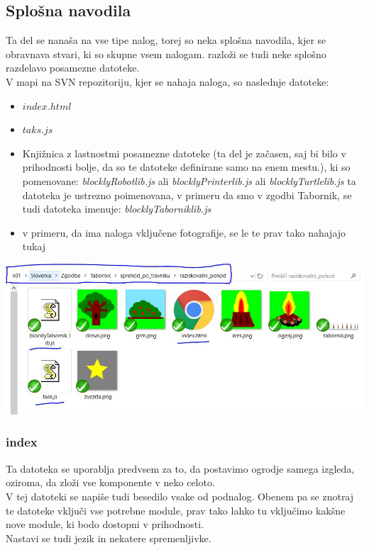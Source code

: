 \documentclass[11pt]{article} %
\begin{document}
\subsection{Splošna navodila}

Ta del se nanaša na vse tipe nalog, torej so neka splošna navodila, kjer se obravnava stvari, ki so skupne vsem nalogam. razloži se tudi neke splošno razdelavo posamezne datoteke.\\

V mapi na SVN repozitoriju, kjer se nahaja naloga, so naslednje datoteke:
\begin{itemize}
\item \textit{$index.html$}
\item \textit{$taks.js$}
\item Knjižnica z lastnostmi posamezne datoteke (ta del je začasen, saj bi bilo v prihodnosti bolje, da so te datoteke definirane samo na enem mestu.), ki so pomenovane: \textit{blocklyRobot\textunderscore lib.js} ali \textit{blocklyPrinter\textunderscore lib.js} ali \textit{blocklyTurtle\textunderscore lib.js} ta datoteka je ustrezno poimenovana, v primeru da smo v zgodbi Tabornik, se tudi datoteka imenuje: \textit{blocklyTabornik\textunderscore lib.js}
\item v primeru, da ima naloga vključene fotografije, se le te prav tako nahajajo tukaj
\end{itemize}

\includegraphics[scale=0.4]{svn_naloga}
\subsubsection{index}

Ta datoteka se uporablja predvsem za to, da postavimo ogrodje samega izgleda, oziroma, da zloži vse komponente v neko celoto. \\[0.5cm]
V tej datoteki se napiše tudi besedilo vsake od podnalog. Obenem pa se znotraj te datoteke vključi vse potrebne module, prav tako lahko tu vključimo kakšne nove module, ki bodo dostopni v prihodnosti. \\[0.5cm]
Nastavi se tudi jezik in nekatere spremenljivke.
\end{document}
